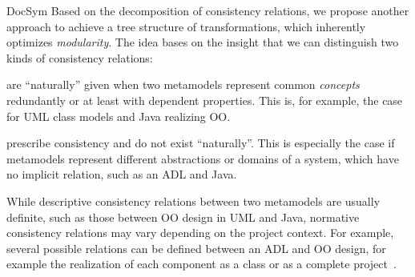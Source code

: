 \begin{copiedFrom}{DocSym}
Based on the decomposition of consistency relations, we propose another approach to achieve a tree structure of transformations, which inherently optimizes \emph{modularity}.
The idea bases on the insight that we can distinguish two kinds of consistency relations:
\begin{description}[leftmargin=\parindent]
    \item[Descriptive consistency relations] are \enquote{naturally} given when two metamodels represent common \emph{concepts} %
    redundantly or at least with dependent properties. This is, for example, the case for \gls{UML} class models and Java realizing \gls{OO}. %
    \item[Normative consistency relations] prescribe consistency and %
    do not exist \enquote{naturally}. This is especially the case if metamodels represent different abstractions or domains of a system, which have no implicit relation, such as an \gls{ADL} and Java. %
\end{description}

While descriptive consistency relations between two metamodels are usually definite, such as those between \gls{OO} design in \gls{UML} and Java, normative consistency relations may vary depending on the project context.
For example, several possible relations can be defined between an \gls{ADL} and \gls{OO} design, for example the realization of each component as a class or as a complete project~\cite{langhammer2017a}.


\end{copiedFrom}

